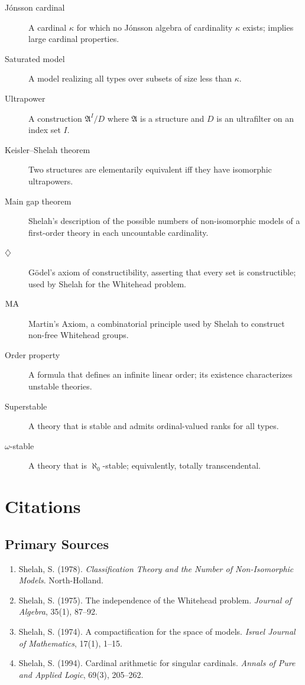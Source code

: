 \begin{description}
    \item[J\'onsson cardinal] A cardinal \(\kappa\) for which no J\'onsson algebra of cardinality \(\kappa\) exists; implies large cardinal properties.
    \item[Saturated model] A model realizing all types over subsets of size less than \(\kappa\).
    \item[Ultrapower] A construction \(\mathfrak{A}^I/D\) where \(\mathfrak{A}\) is a structure and \(D\) is an ultrafilter on an index set \(I\).
    \item[Keisler--Shelah theorem] Two structures are elementarily equivalent iff they have isomorphic ultrapowers.
    \item[Main gap theorem] Shelah's description of the possible numbers of non-isomorphic models of a first-order theory in each uncountable cardinality.
    \item[\(\diamondsuit\)] G\"odel's axiom of constructibility, asserting that every set is constructible; used by Shelah for the Whitehead problem.
    \item[\(\operatorname{MA}\)] Martin's Axiom, a combinatorial principle used by Shelah to construct non-free Whitehead groups.
    \item[Order property] A formula that defines an infinite linear order; its existence characterizes unstable theories.
    \item[Superstable] A theory that is stable and admits ordinal-valued ranks for all types.
    \item[\(\omega\)-stable] A theory that is \(\aleph_0\)-stable; equivalently, totally transcendental.
\end{description}

\section{Citations}

\subsection*{Primary Sources}
\begin{enumerate}
    \item Shelah, S. (1978). \textit{Classification Theory and the Number of Non-Isomorphic Models}. North-Holland.
    \item Shelah, S. (1975). The independence of the Whitehead problem. \textit{Journal of Algebra}, 35(1), 87--92.
    \item Shelah, S. (1974). A compactification for the space of models. \textit{Israel Journal of Mathematics}, 17(1), 1--15.
    \item Shelah, S. (1994). Cardinal arithmetic for singular cardinals. \textit{Annals of Pure and Applied Logic}, 69(3), 205--262.
\end{enumerate}

